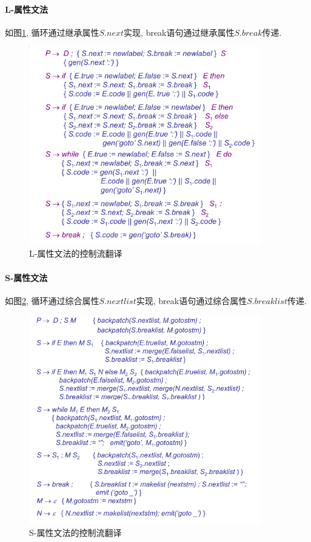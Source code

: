 \documentclass{ctexart}
\begin{document}
\paragraph{L-属性文法}
    如图\ref{ctrlflow-1},
    循环通过继承属性$S.next$实现, break语句通过继承属性$S.break$传递.
    \begin{figure}[ht]
    \centering
    \includegraphics[width=0.9\textwidth]{ctrlflow-1.png}
    \caption{L-属性文法的控制流翻译}
    \label{ctrlflow-1}
    \end{figure}

\paragraph{S-属性文法}
    如图\ref{ctrlflow-2},
    循环通过综合属性$S.nextlist$实现, break语句通过综合属性$S.breaklist$传递.
    \begin{figure}[ht]
    \centering
    \includegraphics[width=0.9\textwidth]{ctrlflow-2.png}
    \caption{S-属性文法的控制流翻译}
    \label{ctrlflow-2}
    \end{figure}
    \FloatBarrier
\end{document}
